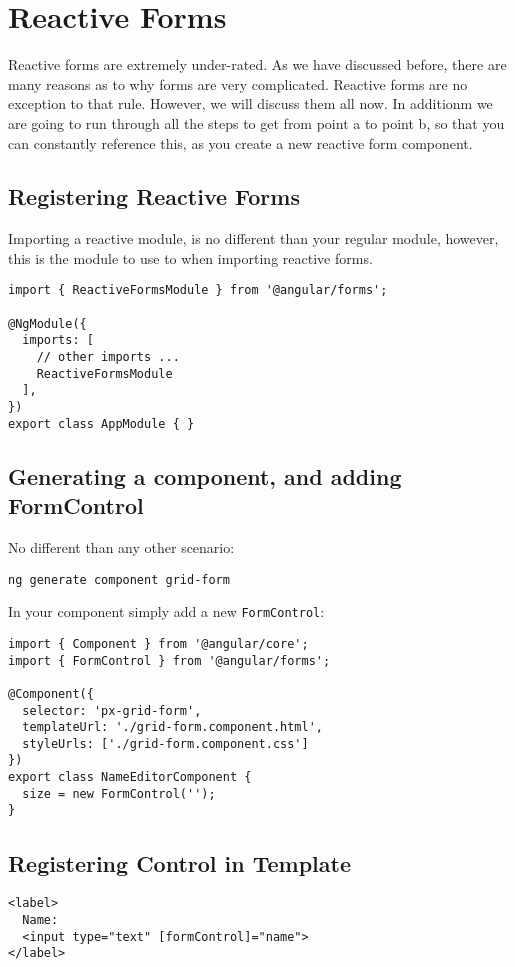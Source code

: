
\section{ Reactive Forms }

Reactive forms are extremely under-rated. As we have discussed before, there are 
many reasons as to why forms are very complicated. Reactive forms are no 
exception to that rule. However, we will discuss them all now. In additionm we
are going to run through all the steps to get from point a to point b, so that
you can constantly reference this, as you create a new reactive form component.

\subsection{ Registering Reactive Forms }

Importing a reactive module, is no different than your regular module, however,
this is the module to use to when importing reactive forms. 

\begin{lstlisting}
import { ReactiveFormsModule } from '@angular/forms';

@NgModule({
  imports: [
    // other imports ...
    ReactiveFormsModule
  ],
})
export class AppModule { }
\end{lstlisting}

\subsection{Generating a component, and adding FormControl}
No different than any other scenario: 
\begin{verbatim}
ng generate component grid-form 
\end{verbatim}

In your component simply add a new \lstinline{FormControl}: 

\begin{lstlisting}
import { Component } from '@angular/core';
import { FormControl } from '@angular/forms';

@Component({
  selector: 'px-grid-form',
  templateUrl: './grid-form.component.html',
  styleUrls: ['./grid-form.component.css']
})
export class NameEditorComponent {
  size = new FormControl('');
}
\end{lstlisting}

\subsection{Registering Control in Template}
\begin{lstlisting}
<label>
  Name:
  <input type="text" [formControl]="name">
</label>
\end{lstlisting}

